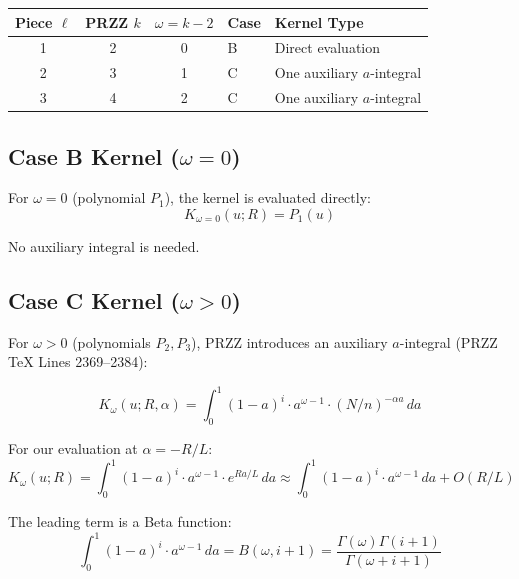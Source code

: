 \documentclass[11pt]{article}
\begin{document}
\begin{center}
\begin{tabular}{cccll}
\toprule
Piece $\ell$ & PRZZ $k$ & $\omega = k-2$ & Case & Kernel Type \\
\midrule
1 & 2 & 0 & B & Direct evaluation \\
2 & 3 & 1 & C & One auxiliary $a$-integral \\
3 & 4 & 2 & C & One auxiliary $a$-integral \\
\bottomrule
\end{tabular}
\end{center}

\subsection{Case B Kernel ($\omega = 0$)}

For $\omega = 0$ (polynomial $P_1$), the kernel is evaluated directly:
\begin{equation}
K_{\omega=0}(u; R) = P_1(u)
\end{equation}

No auxiliary integral is needed.

\subsection{Case C Kernel ($\omega > 0$)}

For $\omega > 0$ (polynomials $P_2, P_3$), PRZZ introduces an auxiliary $a$-integral (PRZZ TeX Lines 2369--2384):

\begin{equation}
\boxed{
K_\omega(u; R, \alpha) = \int_0^1 (1-a)^i \cdot a^{\omega-1} \cdot (N/n)^{-\alpha a} \, da
}
\end{equation}

For our evaluation at $\alpha = -R/L$:
\begin{equation}
K_\omega(u; R) = \int_0^1 (1-a)^i \cdot a^{\omega-1} \cdot e^{Ra/L} \, da \approx \int_0^1 (1-a)^i \cdot a^{\omega-1} \, da + O(R/L)
\end{equation}

The leading term is a Beta function:
\begin{equation}
\int_0^1 (1-a)^i \cdot a^{\omega-1} \, da = B(\omega, i+1) = \frac{\Gamma(\omega)\Gamma(i+1)}{\Gamma(\omega+i+1)}
\end{equation}

\end{document}
